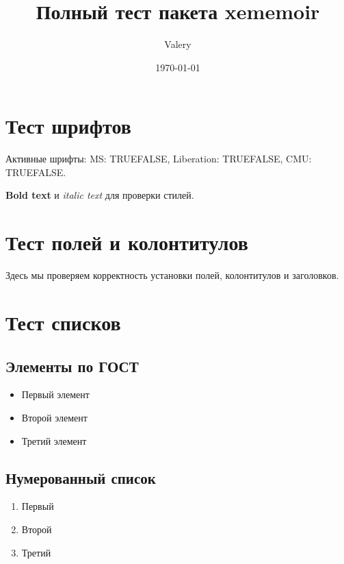 \documentclass[12pt]{memoir}
\title{Полный тест пакета xememoir}
\author{Valery}
\date{\today}
\begin{document}
	\maketitle

	\chapter{Тест шрифтов}
	Активные шрифты:
	MS: \if@xem@ms TRUE\else FALSE\fi,
	Liberation: \if@xem@liberation TRUE\else FALSE\fi,
	CMU: \if@xem@cmu TRUE\else FALSE\fi.

	\textbf{Bold text} и \textit{italic text} для проверки стилей.

	\chapter{Тест полей и колонтитулов}
	Здесь мы проверяем корректность установки полей, колонтитулов и заголовков.
	\lipsum[1-2] %

	\chapter{Тест списков}
	\section{Элементы по ГОСТ}
	\begin{itemize}
		\item Первый элемент
		\item Второй элемент
		\item Третий элемент
	\end{itemize}

	\section{Нумерованный список}
	\begin{enumerate}
		\item Первый
		\item Второй
		\item Третий
	\end{enumerate}
\end{document}
